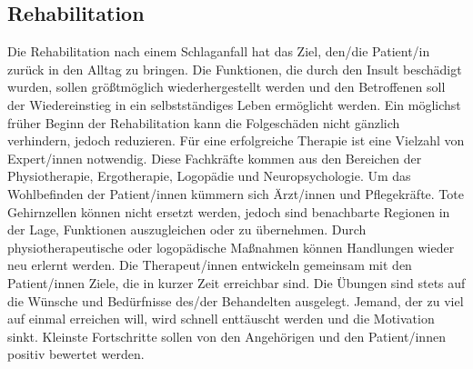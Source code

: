\subsection{Rehabilitation}
Die Rehabilitation nach einem Schlaganfall hat das Ziel, den/die Patient/in zurück in den Alltag zu bringen. Die Funktionen, die durch den Insult beschädigt wurden, sollen größtmöglich wiederhergestellt werden und den Betroffenen soll der Wiedereinstieg in ein selbstständiges Leben ermöglicht werden. Ein möglichst früher Beginn der Rehabilitation kann die Folgeschäden nicht gänzlich verhindern, jedoch reduzieren. Für eine erfolgreiche Therapie ist eine Vielzahl von Expert/innen notwendig. Diese Fachkräfte kommen aus den Bereichen der Physiotherapie, Ergotherapie, Logopädie und Neuropsychologie. Um das Wohlbefinden der Patient/innen kümmern sich Ärzt/innen und Pflegekräfte. Tote Gehirnzellen können nicht ersetzt werden, jedoch sind benachbarte Regionen in der Lage, Funktionen auszugleichen oder zu übernehmen. Durch physiotherapeutische oder logopädische Maßnahmen können Handlungen wieder neu erlernt werden. Die Therapeut/innen entwickeln gemeinsam mit den Patient/innen Ziele, die in kurzer Zeit erreichbar sind. Die Übungen sind stets auf die Wünsche und Bedürfnisse des/der Behandelten ausgelegt. Jemand, der zu viel auf einmal erreichen will, wird schnell enttäuscht werden und die Motivation sinkt. Kleinste Fortschritte sollen von den Angehörigen und den Patient/innen positiv bewertet werden. \cite{haring:2014:insult}

